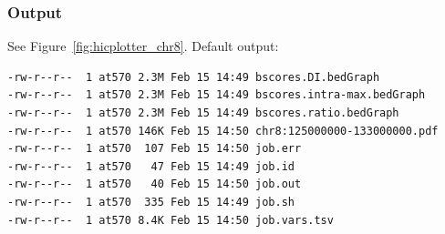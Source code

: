 \subsubsection{Output} %
See Figure~\ref{fig:hicplotter_chr8}. Default output:
\begin{lstlisting}
-rw-r--r--  1 at570 2.3M Feb 15 14:49 bscores.DI.bedGraph
-rw-r--r--  1 at570 2.3M Feb 15 14:49 bscores.intra-max.bedGraph
-rw-r--r--  1 at570 2.3M Feb 15 14:49 bscores.ratio.bedGraph
-rw-r--r--  1 at570 146K Feb 15 14:50 chr8:125000000-133000000.pdf
-rw-r--r--  1 at570  107 Feb 15 14:50 job.err
-rw-r--r--  1 at570   47 Feb 15 14:49 job.id
-rw-r--r--  1 at570   40 Feb 15 14:50 job.out
-rw-r--r--  1 at570  335 Feb 15 14:49 job.sh
-rw-r--r--  1 at570 8.4K Feb 15 14:50 job.vars.tsv
\end{lstlisting}
% 
\begin{figure}[!htb]
    \centering

\end{figure}
